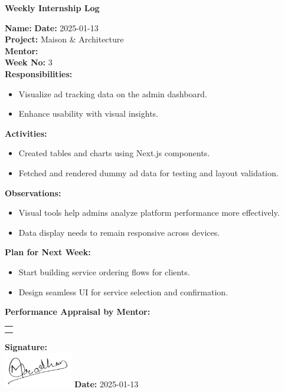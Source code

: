 \begin{center}
    \bfseries Weekly Internship Log
\end{center}

\noindent
\textbf{Name:}  \hfill \textbf{Date:} 2025-01-13 \\
\textbf{Project:} Maison \& Architecture \hfill \\
\textbf{Mentor:}  \\
\textbf{Week No:} 3 \\

\noindent
\textbf{Responsibilities:}
\begin{itemize}
    \item Visualize ad tracking data on the admin dashboard.
    \item Enhance usability with visual insights.
\end{itemize}

\noindent
\textbf{Activities:}
\begin{itemize}
    \item Created tables and charts using Next.js components.
    \item Fetched and rendered dummy ad data for testing and layout validation.
\end{itemize}

\noindent
\textbf{Observations:}
\begin{itemize}
    \item Visual tools help admins analyze platform performance more effectively.
    \item Data display needs to remain responsive across devices.
\end{itemize}

\noindent
\textbf{Plan for Next Week:}
\begin{itemize}
    \item Start building service ordering flows for clients.
    \item Design seamless UI for service selection and confirmation.
\end{itemize}

\noindent
\textbf{Performance Appraisal by Mentor:} \\
\begin{table}[h]
    \centering
    \noindent
    \begin{tabularx}{\textwidth} { 
        | >{\centering\arraybackslash}X| }

        \hline
        \\ \\
        \hline
    \end{tabularx}
\end{table}

\vfill
\noindent
\textbf{Signature:} \\
\includegraphics[width=3cm]{assets/nirajpradhan-sign.png} \hfill \textbf{Date:} 2025-01-13
